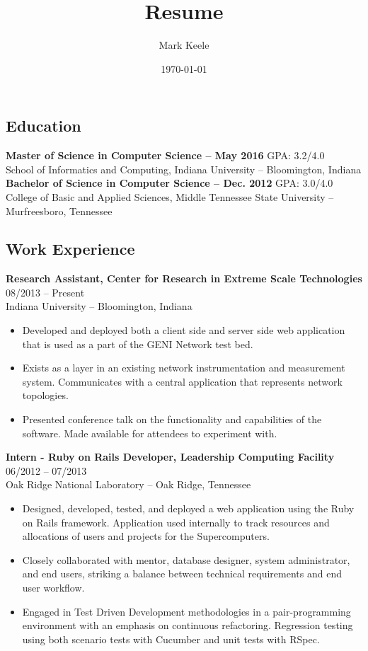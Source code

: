 \documentclass[12pt,letterpaper]{article}
\author{Mark Keele}
\title{Resume}
\date{\today}
\begin{document}
\subsection*{Education}

\textbf{Master of Science in Computer Science -- May 2016}
\hfill{GPA: 3.2/4.0} \\
\bigskip School of Informatics and Computing, Indiana University -- Bloomington, Indiana \\
\noindent\textbf{Bachelor of Science in Computer Science -- Dec. 2012}
\hfill{GPA: 3.0/4.0}\\
College of Basic and Applied Sciences, Middle Tennessee State University -- Murfreesboro, Tennessee


\subsection*{Work Experience}

\textbf{Research Assistant, Center for Research in Extreme Scale Technologies}
\hfill{08/2013 -- Present} \\
Indiana University -- Bloomington, Indiana

\begin{itemize}

  \item Developed and deployed both a client side and server side web
  application that is used as a part of the GENI Network test bed.

  \item Exists as a layer in an existing network instrumentation and
  measurement system. Communicates with a central application that represents
  network topologies.

  \item Presented conference talk on the functionality and capabilities of the software.
  Made available for attendees to experiment with.

\end{itemize}


\noindent\textbf{Intern - Ruby on Rails Developer, Leadership Computing Facility}
\hfill{06/2012 -- 07/2013} \\
Oak Ridge National Laboratory -- Oak Ridge, Tennessee

\begin{itemize}

	\item Designed, developed, tested, and deployed a web application using the Ruby
	on Rails framework. Application used internally to track resources and allocations
  of users and projects for the Supercomputers.

  \item Closely collaborated with mentor, database designer, system administrator, and end users, striking a balance between technical requirements and end user workflow.

  \item Engaged in Test Driven Development methodologies in a pair-programming environment
  with an emphasis on continuous refactoring.
  Regression testing using both scenario tests with Cucumber and unit tests with RSpec.

\end{itemize}
\end{document}
